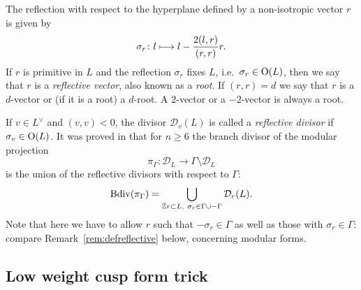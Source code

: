 \documentclass[a4paper,11pt]{article}
\newcommand{\ZZ}{\mathbb Z}
\renewcommand{\cD}{\mathcal D}
\newcommand{\Mapsto}{\mapstochar\longrightarrow}
\newcommand{\Orth}{\mathop{\null\mathrm {O}}\nolimits}
\newcommand{\Bdiv}{\mathop{\null\mathrm {Bdiv}}\nolimits}
\begin{document}
The reflection with respect to the hyperplane defined by a
non-isotropic vector $r$ is given by
\begin{equation}\label{sigma_r}
\sigma_r\colon l\Mapsto l-\frac{2(l,r)}{(r,r)}r.
\end{equation}
If $r$ is primitive in $L$ and the reflection $\sigma_r$ fixes $L$,
i.e.\ $\sigma_r\in \Orth(L)$, then we say that $r$ is a
\emph{reflective vector}, also known as a \emph{root}. If $(r,r)=d$ we
say that $r$ is a $d$-vector or (if it is a root) a $d$-root. A
$2$-vector or a $-2$-vector is always a root.

If $v\in L^\vee$ and $(v,v)<0$, the divisor $\cD_v(L)$ is called a
\emph{reflective divisor} if $\sigma_v\in \Orth(L)$.  It was proved in
\cite[Corollary 2.13]{GHSK3} that for $n\ge 6$ the branch divisor of
the modular projection
\begin{equation*}
\pi_\Gamma\colon  \cD_L\to \Gamma\setminus \cD_L
\end{equation*}
is the union of the reflective divisors with respect to $\Gamma$:
\begin{equation}\label{br-div}
\Bdiv(\pi_\Gamma)=\bigcup_{\ZZ{r}\subset L,\ \sigma_r\in \Gamma\cup -\Gamma} \cD_r(L).
\end{equation}
Note that here we have to allow $r$ such that $-\sigma_r\in \Gamma$ as
well as those with $\sigma_r\in\Gamma$: compare
Remark~\ref{rem:defreflective} below, concerning modular forms.

\subsection{Low weight cusp form trick}\label{subsect:lowwttrick}
\end{document}
